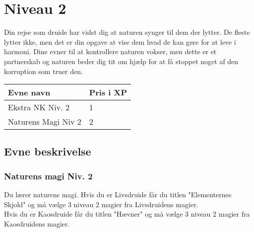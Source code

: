 \chapter{Niveau 2}

Din rejse som druide har vidst dig at naturen synger til dem der lytter. De fleste lytter ikke, men det er din opgave at vise dem hvad de kan gøre for at leve i harmoni. Dine evner til at kontrollere naturen vokser, men dette er et partnerskab og naturen beder dig tit om hjælp for at få stoppet noget af den korruption som truer den.

\begin{table}[H]
    \centering
    \begin{tabular}{|p{}|p{}|}
    \rowcolor{cerulean!80}\hline
        Evne navn & Pris i XP \\\hline
        Ekstra NK Niv. 2 & 1\\\hline
        Naturens Magi Niv 2 & 2\\\hline
    \end{tabular}
\end{table}
\section{Evne beskrivelse}



\subsection{Naturens magi Niv. 2}
Du lærer naturens magi. Hvis du er Livsdruide får du titlen "Elementernes Skjold" og må vælge 3 niveau 2 magier fra Livsdruidens magier.\\ Hvis du er Kaosdruide får du titlen "Hævner" og må vælge 3 niveau 2 magier fra Kaosdruidens magier.\\
